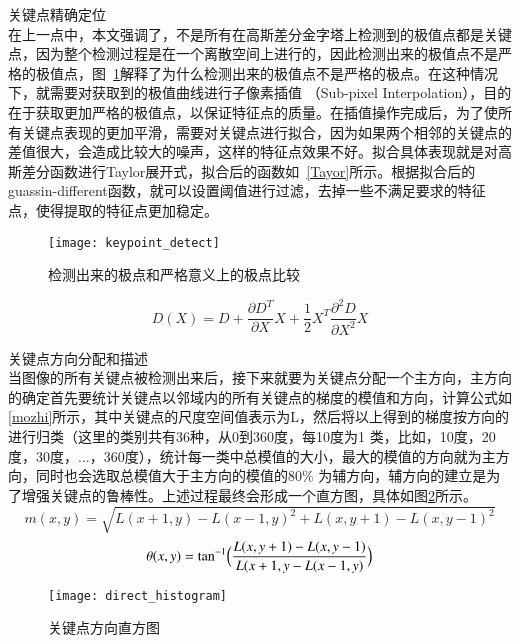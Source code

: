 \begin{compactenum}
\item 关键点精确定位\\在上一点中，本文强调了，不是所有在高斯差分金字塔上检测到的极值点都是关键点，因为整个检测过程是在一个离散空间上进行的，因此检测出来的极值点不是严格的极值点，图~\ref{fig:keypoint_detect}解释了为什么检测出来的极值点不是严格的极点。在这种情况下，就需要对获取到的极值曲线进行子像素插值 （Sub-pixel Interpolation），目的在于获取更加严格的极值点，以保证特征点的质量。在插值操作完成后，为了使所有关键点表现的更加平滑，需要对关键点进行拟合，因为如果两个相邻的关键点的差值很大，会造成比较大的噪声，这样的特征点效果不好。拟合具体表现就是对高斯差分函数进行Taylor展开式，拟合后的函数如~\ref{Tayor}所示。根据拟合后的guassin-different函数，就可以设置阈值进行过滤，去掉一些不满足要求的特征点，使得提取的特征点更加稳定。
\begin{figure}[htp]
\centering
\texttt{[image: keypoint\_detect]}
\caption{检测出来的极点和严格意义上的极点比较}
\label{fig:keypoint_detect}
\end{figure}


\begin{equation}\label{Tayor}
D(X)=D+\frac{\partial{D}^T}{\partial{X}}X+\frac{1}{2}X^T\frac{\partial^2{D}}{\partial{X}^2}X
\end{equation}

\item 关键点方向分配和描述\\当图像的所有关键点被检测出来后，接下来就要为关键点分配一个主方向，主方向的确定首先要统计关键点以邻域内的所有关键点的梯度的模值和方向，计算公式如\ref{mozhi}所示，其中关键点的尺度空间值表示为L，然后将以上得到的梯度按方向的进行归类（这里的类别共有36种，从0到360度，每10度为1 类，比如，10度，20度，30度，...，360度），统计每一类中总模值的大小，最大的模值的方向就为主方向，同时也会选取总模值大于主方向的模值的80\% 为辅方向，辅方向的建立是为了增强关键点的鲁棒性。上述过程最终会形成一个直方图，具体如图\ref{fig:direct_histogram}所示。
\begin{equation}\label{mozhi}
m(x,y)=\sqrt{L(x+1,y)-{L(x-1,y)}^2+L(x,y+1)-{L(x,y-1)}^2}
\end{equation}
\begin{equation}\label{fangxiang}
\theta(x,y)=\tan^{-1}\Bigl({\frac{L(x,y+1)-L(x,y-1)}{L(x+1,y-L(x-1,y)}}\Bigr)
\end{equation}
\end{compactenum}

\begin{figure}[htp]
\centering
\texttt{[image: direct\_histogram]}
\caption{关键点方向直方图}
\label{fig:direct_histogram}
\end{figure}

